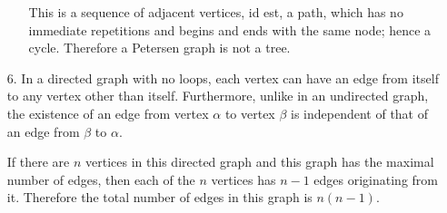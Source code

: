 \documentclass[fleqn]{article}
\begin{document}
\begin{enumerate}
\begin{enumerate}
		This is a sequence of adjacent vertices, id est, a path, which has no immediate repetitions and begins and ends with the same node; hence a cycle. Therefore a Petersen graph is not a tree.
	\end{enumerate}

	\bigskip
	\item[6.]
	In a directed graph with no loops, each vertex can have an edge from itself to any vertex other than itself. Furthermore, unlike in an undirected graph, the existence of an edge from vertex \(\alpha\) to vertex \(\beta\) is independent of that of an edge from \(\beta\) to \(\alpha\).

	If there are \(n\) vertices in this directed graph and this graph has the maximal number of edges, then each of the \(n\) vertices has \(n - 1\) edges originating from it. Therefore the total number of edges in this graph is \(n(n - 1)\).

\end{enumerate}
    
\end{document}

